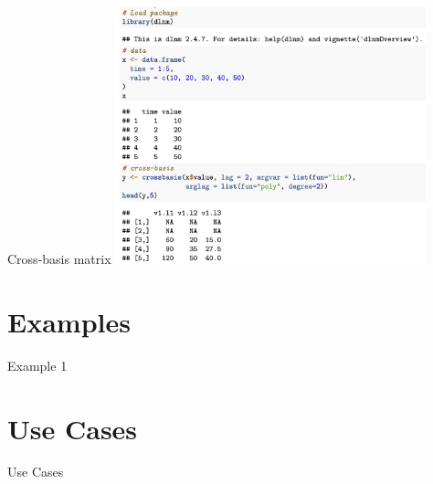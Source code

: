 \documentclass[english]{beamer}
\begin{document}
\begin{frame}{Cross-basis matrix}
\centering
    \includegraphics[width=9cm,keepaspectratio]{images/crossbasis_result.png}
\end{frame}

\section{Examples}
\begin{frame}{Example 1}
    
\end{frame}
\section{Use Cases }
\begin{frame}{Use Cases}
    
\end{frame}
\end{document}
